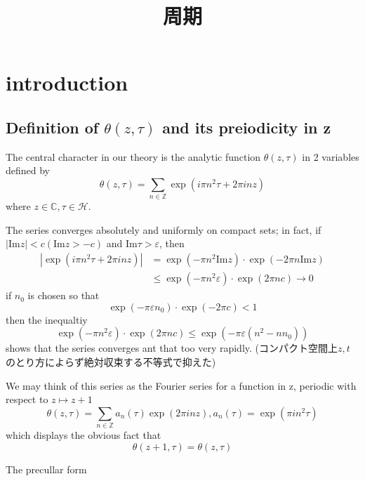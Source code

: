 \documentclass[uplatex,b5j,11pt]{jsbook}
\title{周期}
\begin{document}
\chapter{introduction}


\section{Definition of $\theta(z, \tau)$ and its preiodicity in z}
\label{Definition of theta(z, tau) and its preiodicity in z}
The central character in our theory is the analytic function $\theta(z, \tau)$ in 2 variables defined by
\begin{equation*}
    \theta(z, \tau) = \sum_{n \in \mathbb{Z}} \exp(i\pi n^2 \tau + 2\pi in z)
\end{equation*}
where $z \in \mathbb{C}, \tau \in \mathcal{H}$.

The series converges absolutely and uniformly on compact sets; in fact,
if $|\mathrm{Im} z| < c (\mathrm{Im}z > -c)$ and $ \mathrm{Im} \tau > \varepsilon$, then
\begin{align*}
|\exp(i\pi n^2 \tau + 2\pi in z)| & = \exp(- \pi n^2 \mathrm{Im}z) \cdot \exp(-2 \pi n \mathrm{Im}z) \\
                                  & \le \exp(-\pi n^2 \varepsilon) \cdot \exp( 2 \pi n c) \to 0
\end{align*}
if $n_0$ is chosen so that
\begin{equation*}
  \exp(- \pi \varepsilon n_0) \cdot \exp(-2 \pi c) < 1
\end{equation*}
then the inequaltiy
\begin{equation*}
     \exp(-\pi n^2 \varepsilon) \cdot \exp( 2 \pi n c)  \le \exp(- \pi \varepsilon (n^2 - nn_0))
\end{equation*}
shows that the series converges ant that too very rapidly.
(コンパクト空間上$z,t$のとり方によらず絶対収束する不等式で抑えた)

We may think of this series as the Fourier series for a function in z, periodic with respect to $z \mapsto z +1$
\begin{equation*}
 \theta (z, \tau) = \sum_{n \in \mathbb{Z}}a_n(\tau) \exp(2 \pi i n z), a_n(\tau) = \exp(\pi i n^2 \tau)
\end{equation*}
which displays the obvious fact that
\begin{equation*}
 \theta(z+1, \tau)  = \theta(z, \tau)
\end{equation*}

The precullar form
\end{document}
